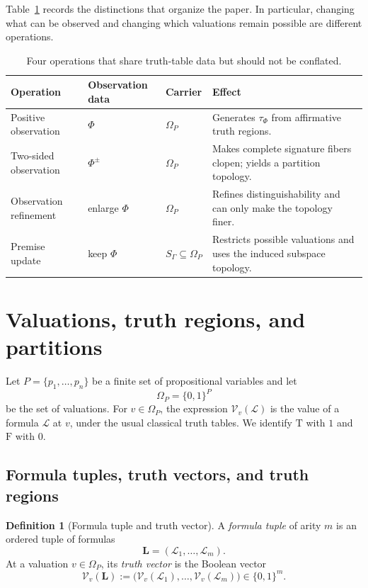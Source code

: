 \documentclass[11pt]{article}
\theoremstyle{definition}
\newtheorem{definition}{Definition}[section]
\theoremstyle{plain}
\theoremstyle{remark}
\newcommand{\True}{\mathrm{T}}
\newcommand{\False}{\mathrm{F}}
\begin{document}
Table~\ref{tab:four-operations} records the distinctions that organize the
paper.  In particular, changing what can be observed and changing which
valuations remain possible are different operations.

\begin{table}[!ht]
\centering
\small
\renewcommand{\arraystretch}{1.18}
\begin{tabular}{@{}>{\raggedright\arraybackslash}p{}>{\raggedright\arraybackslash}p{}p{}>{\raggedright\arraybackslash}p{}@{}}
\toprule
Operation & Observation data & Carrier & Effect \\
\midrule
Positive observation & $\Phi$ & $\Omega_P$ & Generates $\tau_\Phi$ from affirmative truth regions. \\
Two-sided observation & $\Phi^{\pm}$ & $\Omega_P$ & Makes complete signature fibers clopen; yields a partition topology. \\
Observation refinement & enlarge $\Phi$ & $\Omega_P$ & Refines distinguishability and can only make the topology finer. \\
Premise update & keep $\Phi$ & $S_\Gamma\subseteq\Omega_P$ & Restricts possible valuations and uses the induced subspace topology. \\
\bottomrule
\end{tabular}
\caption{Four operations that share truth-table data but should not be conflated.}
\label{tab:four-operations}
\end{table}

\section{Valuations, truth regions, and partitions}

Let $P=\{p_1,\ldots,p_n\}$ be a finite set of propositional variables and let
\[
  \Omega_P=\{0,1\}^{P}
\]
be the set of valuations.  For $v\in\Omega_P$, the expression
$\mathcal V_v(\mathcal L)$ is the value of a formula $\mathcal L$ at $v$, under
the usual classical truth tables.  We identify $\True$ with $1$ and $\False$
with $0$.

\subsection{Formula tuples, truth vectors, and truth regions}

\begin{definition}[Formula tuple and truth vector]
A \emph{formula tuple} of arity $m$ is an ordered tuple of formulas
\[
 \mathbf L=(\mathcal L_1,\ldots,\mathcal L_m).
\]
At a valuation $v\in\Omega_P$, its \emph{truth vector} is the Boolean vector
\[
 \mathcal V_v(\mathbf L)
 :=\bigl(\mathcal V_v(\mathcal L_1),\ldots,
          \mathcal V_v(\mathcal L_m)\bigr)
 \in\{0,1\}^m.
\]
\end{definition}
\end{document}
